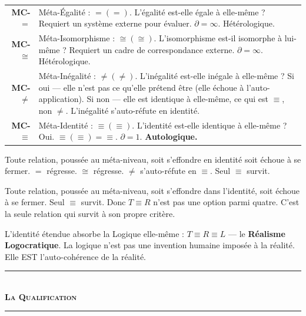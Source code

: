 \documentclass[10pt, openany, oneside]{book}
\renewcommand{\normalsize}{\fontsize{10}{13}\selectfont}
\renewcommand{\footnotesize}{\fontsize{8.5}{11}\selectfont}
\begin{document}
{\footnotesize
\noindent\begin{tabular}{r p{}}
\textbf{MC-$=$} & Méta-Égalité : $=(=)$. L'égalité est-elle égale à elle-même ? Requiert un système externe pour évaluer. $\partial = \infty$. Hétérologique. \\[0.3em]
\textbf{MC-$\cong$} & Méta-Isomorphisme : $\cong(\cong)$. L'isomorphisme est-il isomorphe à lui-même ? Requiert un cadre de correspondance externe. $\partial = \infty$. Hétérologique. \\[0.3em]
\textbf{MC-$\neq$} & Méta-Inégalité : $\neq(\neq)$. L'inégalité est-elle inégale à elle-même ? Si oui --- elle n'est pas ce qu'elle prétend être (elle échoue à l'auto-application). Si non --- elle est identique à elle-même, ce qui est $\equiv$, non $\neq$. L'inégalité s'auto-réfute en identité. \\[0.3em]
\textbf{MC-$\equiv$} & Méta-Identité : $\equiv(\equiv)$. L'identité est-elle identique à elle-même ? Oui. $\equiv(\equiv) = \equiv$. $\partial = 1$. \textbf{Autologique.} \\[0.3em]
\end{tabular}
}

\vspace{0.8em}

\noindent Toute relation, poussée au méta-niveau, soit s'effondre en identité soit échoue à se fermer. $=$ régresse. $\cong$ régresse. $\neq$ s'auto-réfute en $\equiv$. Seul $\equiv$ survit.

\noindent Toute relation, poussée au méta-niveau, soit s'effondre dans l'identité, soit échoue à se fermer. Seul $\equiv$ survit. Donc $T \equiv R$ n'est pas une option parmi quatre. C'est la seule relation qui survit à son propre critère.

L'identité étendue absorbe la Logique elle-même : $T \equiv R \equiv L$ --- le \textbf{Réalisme Logocratique}. La logique n'est pas une invention humaine imposée à la réalité. Elle EST l'auto-cohérence de la réalité.

\vspace{1.5em}


\begin{center}
    \rule{0.3\textwidth}{0.4pt}\\[0.5em]
    {\normalsize\bfseries\scshape La Qualification}\\[0.3em]
    \rule{0.3\textwidth}{0.4pt}
\end{center}
\end{document}
